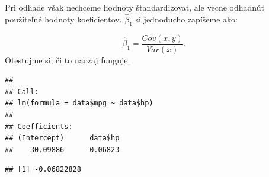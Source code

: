 Pri odhade však nechceme hodnoty štandardizovať, ale vecne odhadnúť
použiteľné hodnoty koeficientov. \(\hat\beta_1\) si jednoducho zapíšeme
ako:

\[\hat\beta_1 = \frac{Cov(x, y)}{Var(x)}.\] Otestujme si, či to naozaj
funguje.

\begin{Shaded}
\begin{Highlighting}[]
\end{Highlighting}
\end{Shaded}

\begin{verbatim}
## 
## Call:
## lm(formula = data$mpg ~ data$hp)
## 
## Coefficients:
## (Intercept)      data$hp  
##    30.09886     -0.06823
\end{verbatim}

\begin{Shaded}
\begin{Highlighting}[]
\StringTok{ }\OperatorTok{$}\OperatorTok{$}

\StringTok{ }\OperatorTok{$}
\StringTok{ }\OperatorTok{/}

\end{Highlighting}
\end{Shaded}

\begin{verbatim}
## [1] -0.06822828
\end{verbatim}

\begin{Shaded}
\begin{Highlighting}[]

\StringTok{ }\OperatorTok{$}
\StringTok{ }\OperatorTok{$}

\StringTok{ }\OperatorTok{-}\StringTok{ }\OperatorTok{*}\StringTok{ }

\end{Highlighting}
\end{Shaded}

